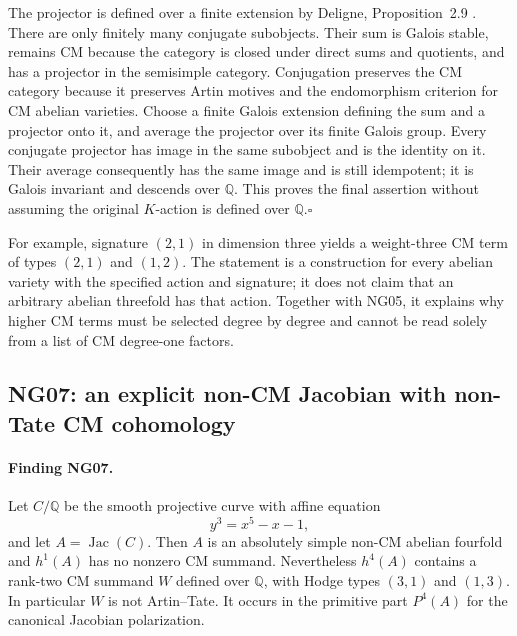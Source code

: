 The projector is defined over a finite extension by Deligne,
Proposition~2.9 \cite{NGDeligne82}.  There are only finitely many conjugate subobjects.
Their sum is Galois stable, remains CM because the category is closed
under direct sums and quotients, and has a projector in the semisimple
category.  Conjugation preserves the CM category because it preserves
Artin motives and the endomorphism criterion for CM abelian varieties.
Choose a finite Galois extension defining the sum and a projector
onto it, and average the projector over its finite Galois group.
Every conjugate projector has image in the same subobject and is the
identity on it.  Their average consequently has the same image and
is still idempotent; it is Galois invariant and descends over
$\mathbb Q$.  This proves the final assertion without assuming the
original $K$-action is defined over $\mathbb Q$.\hfill$\square$

For example, signature $(2,1)$ in dimension three yields a weight-three
CM term of types $(2,1)$ and $(1,2)$.  The statement is a construction
for every abelian variety with the specified action and signature;
it does not claim that an arbitrary abelian threefold has that action.
Together with NG05, it explains why higher CM terms must be selected
degree by degree and cannot be read solely from a list of CM
degree-one factors.

\subsection{NG07: an explicit non-CM Jacobian with non-Tate CM cohomology}
\label{NG07}

\paragraph{Finding NG07.}
Let $C/\mathbb Q$ be the smooth projective curve with affine equation
\[
                            y^3=x^5-x-1,
\]
and let $A=\operatorname{Jac}(C)$.  Then $A$ is an absolutely simple
non-CM abelian fourfold and $h^1(A)$ has no nonzero CM summand.
Nevertheless $h^4(A)$ contains a rank-two CM summand $W$ defined over
$\mathbb Q$, with Hodge types $(3,1)$ and $(1,3)$.  In particular
$W$ is not Artin--Tate.  It occurs in the primitive part $P^4(A)$
for the canonical Jacobian polarization.

